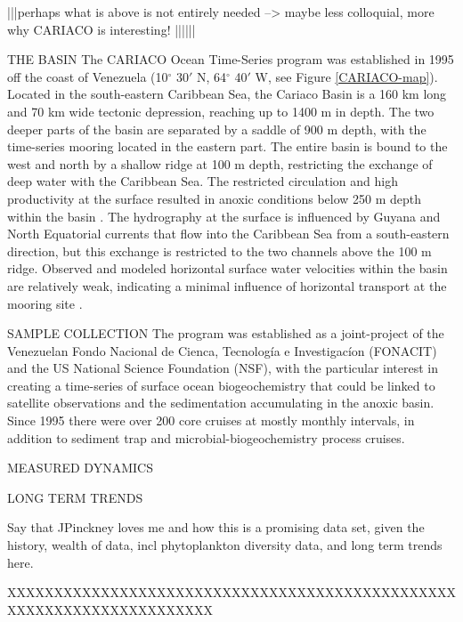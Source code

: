 |||perhaps what is above is not entirely needed --> maybe less colloquial, more why CARIACO is interesting! ||||||

THE BASIN
The CARIACO Ocean Time-Series program was established in 1995 off the coast of Venezuela (10$^\circ$ 30$'$ N, 64$^\circ$ 40$'$ W, see Figure \ref{CARIACO-map}). Located in the south-eastern Caribbean Sea, the Cariaco Basin is a 160 km long and 70 km wide tectonic depression, reaching up to 1400 m in depth. The two deeper parts of the basin are separated by a saddle of 900 m depth, with the time-series mooring located in the eastern part. The entire basin is bound to the west and north by a shallow ridge at 100 m depth, restricting the exchange of deep water with the Caribbean Sea. The restricted circulation and high productivity at the surface resulted in anoxic conditions below 250 m depth within the basin \citep{Richards1956}. The hydrography at the surface is influenced by Guyana and North Equatorial currents that flow into the Caribbean Sea from a south-eastern direction, but this exchange is restricted to the two channels above the 100 m ridge. Observed and modeled horizontal surface water velocities within the basin are relatively weak, indicating a minimal influence of horizontal transport at the mooring site \citep{Alvera-Azcarate2009}. 


SAMPLE COLLECTION
The program was established as a joint-project of the Venezuelan Fondo Nacional de Cienca, Tecnolog\'{i}a e Investigac\'{i}on (FONACIT) and the US National Science Foundation (NSF), with the particular interest in creating a time-series of surface ocean biogeochemistry that could be linked to satellite observations and the sedimentation accumulating in the anoxic basin. Since 1995 there were over 200 core cruises at mostly monthly intervals, in addition to sediment trap and microbial-biogeochemistry process cruises. 


MEASURED DYNAMICS

LONG TERM TRENDS


Say that JPinckney loves me
and how this is a promising data set, given the history, wealth of data, incl phytoplankton diversity data, and long term trends here.


XXXXXXXXXXXXXXXXXXXXXXXXXXXXXXXXXXXXXXXXXXXXXXXXXXXXXXXXXXXXXXXXXXXXXX

